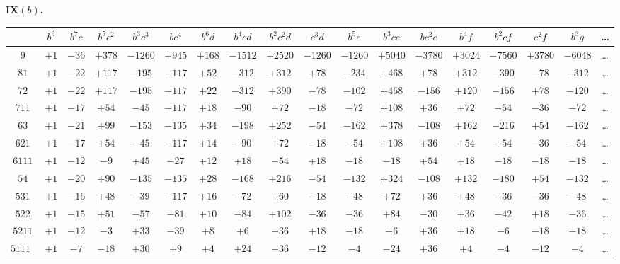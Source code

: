 \documentclass[12pt,a4paper]{article}
\theoremstyle{definition}
\begin{document}
\noindent\textbf{IX$(b)$.}
\begin{center}
\tiny
\begin{tabular}{c|c|c|c|c|c|c|c|c|c|c|c|c|c|c|c|c|c}
& $b^9$ & $b^7c$ & $b^5c^2$ & $b^3c^3$ & $bc^4$ & $b^6d$ & $b^4cd$ & $b^2c^2d$ & $c^3d$ & $b^5e$ & $b^3ce$ & $bc^2e$ & $b^4f$ & $b^2cf$ & $c^2f$ & $b^3g$ & \dots \\
\hline
$9$ & $+1$ & $-36$ & $+378$ & $-1260$ & $+945$ & $+168$ & $-1512$ & $+2520$ & $-1260$ & $-1260$ & $+5040$ & $-3780$ & $+3024$ & $-7560$ & $+3780$ & $-6048$ & \dots \\
$81$ & $+1$ & $-22$ & $+117$ & $-195$ & $-117$ & $+52$ & $-312$ & $+312$ & $+78$ & $-234$ & $+468$ & $+78$ & $+312$ & $-390$ & $-78$ & $-312$ & \dots \\
$72$ & $+1$ & $-22$ & $+117$ & $-195$ & $-117$ & $+22$ & $-312$ & $+390$ & $-78$ & $-102$ & $+468$ & $-156$ & $+120$ & $-156$ & $+78$ & $-120$ & \dots \\
$711$ & $+1$ & $-17$ & $+54$ & $-45$ & $-117$ & $+18$ & $-90$ & $+72$ & $-18$ & $-72$ & $+108$ & $+36$ & $+72$ & $-54$ & $-36$ & $-72$ & \dots \\
$63$ & $+1$ & $-21$ & $+99$ & $-153$ & $-135$ & $+34$ & $-198$ & $+252$ & $-54$ & $-162$ & $+378$ & $-108$ & $+162$ & $-216$ & $+54$ & $-162$ & \dots \\
$621$ & $+1$ & $-17$ & $+54$ & $-45$ & $-117$ & $+14$ & $-90$ & $+72$ & $-18$ & $-54$ & $+108$ & $+36$ & $+54$ & $-54$ & $-36$ & $-54$ & \dots \\
$6111$ & $+1$ & $-12$ & $-9$ & $+45$ & $-27$ & $+12$ & $+18$ & $-54$ & $+18$ & $-18$ & $-18$ & $+54$ & $+18$ & $-18$ & $-18$ & $-18$ & \dots \\
$54$ & $+1$ & $-20$ & $+90$ & $-135$ & $-135$ & $+28$ & $-168$ & $+216$ & $-54$ & $-132$ & $+324$ & $-108$ & $+132$ & $-180$ & $+54$ & $-132$ & \dots \\
$531$ & $+1$ & $-16$ & $+48$ & $-39$ & $-117$ & $+16$ & $-72$ & $+60$ & $-18$ & $-48$ & $+72$ & $+36$ & $+48$ & $-36$ & $-36$ & $-48$ & \dots \\
$522$ & $+1$ & $-15$ & $+51$ & $-57$ & $-81$ & $+10$ & $-84$ & $+102$ & $-36$ & $-36$ & $+84$ & $-30$ & $+36$ & $-42$ & $+18$ & $-36$ & \dots \\
$5211$ & $+1$ & $-12$ & $-3$ & $+33$ & $-39$ & $+8$ & $+6$ & $-36$ & $+18$ & $-18$ & $-6$ & $+36$ & $+18$ & $-6$ & $-18$ & $-18$ & \dots \\
$51111$ & $+1$ & $-7$ & $-18$ & $+30$ & $+9$ & $+4$ & $+24$ & $-36$ & $-12$ & $-4$ & $-24$ & $+36$ & $+4$ & $-4$ & $-12$ & $-4$ & \dots \\

\end{tabular}
\end{center}
\end{document}
